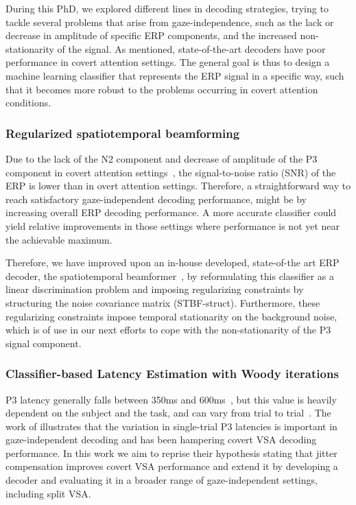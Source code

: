 During this PhD, we explored different lines in decoding strategies,
trying to tackle several problems that arise from gaze-independence, such as
the lack or decrease in amplitude of specific ERP components, and the increased
non-stationarity of the signal.
As mentioned, state-of-the-art decoders have poor performance in covert attention
settings.
The general goal is thus to design a machine learning classifier that represents
the ERP signal in a specific way, such that it becomes more robust to the problems
occurring in covert attention conditions.

\subsubsection{Regularized spatiotemporal beamforming}
Due to the lack of the N2 component and decrease of amplitude of the
P3 component in covert attention
settings~\cite{Treder2010}, the signal-to-noise ratio (SNR) of
the ERP is lower than in overt attention settings.
Therefore, a straightforward way to reach satisfactory
gaze-independent decoding performance, might be by increasing overall ERP
decoding performance. A more accurate classifier could yield relative
improvements in those settings where performance is not yet near the achievable
maximum.

Therefore, we have improved upon an in-house developed, state-of-the art ERP
decoder, the spatiotemporal beamformer~\cite{Wittevrongel2016}, by reformulating
this classifier as a linear discrimination problem and
imposing regularizing constraints by structuring the noise covariance matrix
(STBF-struct).
Furthermore, these regularizing constraints impose temporal stationarity on
the background noise, which is of use in our next efforts to cope with the
non-stationarity of the P3 signal component.

\subsubsection{Classifier-based Latency Estimation with Woody iterations}

P3 latency generally falls between 350ms and 600ms~\cite{Luck2014}, but this
value is heavily dependent on the subject and the task, and can vary from trial
to trial~\cite{Ouyang2017}.
The work of \cite{Arico2014} illustrates that the variation in single-trial P3
latencies is important in gaze-independent decoding and has been hampering covert
VSA decoding performance.
In this work we aim to reprise their hypothesis stating that jitter compensation improves
covert VSA performance and extend it by developing a decoder and evaluating it
in a broader range of gaze-independent settings, including split VSA.

